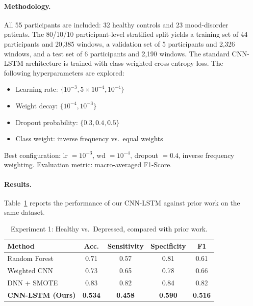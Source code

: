 \paragraph{Methodology.}
All 55 participants are included: 32 healthy controls and 23 mood-disorder patients. The 80/10/10 participant-level stratified split yields a training set of 44 participants and 20,385 windows, a validation set of 5 participants and 2,326 windows, and a test set of 6 participants and 2,190 windows. The standard CNN-LSTM architecture is trained with class-weighted cross-entropy loss. The following hyperparameters are explored:
\begin{itemize}[nosep]
  \item Learning rate: $\{10^{-3}, 5 \times 10^{-4}, 10^{-4}\}$
  \item Weight decay: $\{10^{-4}, 10^{-3}\}$
  \item Dropout probability: $\{0.3, 0.4, 0.5\}$
  \item Class weight: inverse frequency vs.\ equal weights
\end{itemize}
Best configuration: lr $= 10^{-3}$, wd $= 10^{-4}$, dropout $= 0.4$, inverse frequency weighting. Evaluation metric: macro-averaged F1-Score.

\paragraph{Results.}
Table~\ref{tab:exp1_results} reports the performance of our CNN-LSTM against prior work on the same dataset.

\begin{table}[H]
\centering
\caption{Experiment 1: Healthy vs.\ Depressed, compared with prior work.}
\label{tab:exp1_results}
\begin{tabular}{lcccc}
\toprule
\textbf{Method} & \textbf{Acc.} & \textbf{Sensitivity} & \textbf{Specificity} & \textbf{F1} \\
\midrule
Random Forest \cite{garcia2018depresjon} & 0.71 & 0.57 & 0.81 & 0.61 \\
Weighted CNN \cite{jakobsen2020applying} & 0.73 & 0.65 & 0.78 & 0.66 \\
DNN + SMOTE \cite{jakobsen2020applying} & 0.83 & 0.82 & 0.84 & 0.82 \\
\textbf{CNN-LSTM (Ours)} & \textbf{0.534} & \textbf{0.458} & \textbf{0.590} & \textbf{0.516} \\
\bottomrule
\end{tabular}
\end{table}

